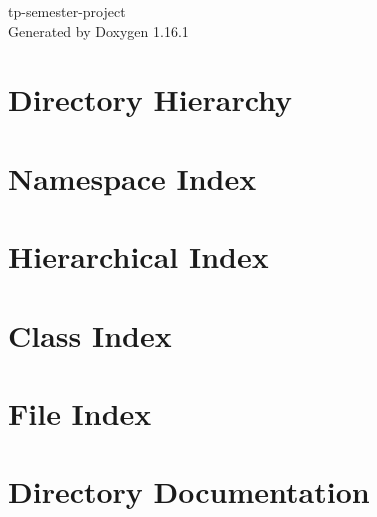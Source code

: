 \documentclass[twoside]{book}
\newcommand{\+}{\discretionary{\mbox{\scriptsize$\hookleftarrow$}}{}{}}
\newcommand{\clearemptydoublepage}{%
    \newpage{\pagestyle{empty}\cleardoublepage}%
  }
\begin{document}
  \raggedbottom
    \hypersetup{pageanchor=false,
                bookmarksnumbered=true,
                pdfencoding=unicode
               }
  \begin{titlepage}
  \vspace*{7cm}
  \begin{center}%
  {\Large tp-\/semester-\/project}\\
  \vspace*{1cm}
  {\large Generated by Doxygen 1.16.1}\\
  \end{center}
  \end{titlepage}
  \clearemptydoublepage
  \tableofcontents
  \clearemptydoublepage
  \hypersetup{pageanchor=true}


\chapter{Directory Hierarchy}

\chapter{Namespace Index}

\chapter{Hierarchical Index}

\chapter{Class Index}

\chapter{File Index}

\chapter{Directory Documentation}










\end{document}
